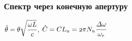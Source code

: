 \documentclass[14pt, hyperref = {colorlinks}]{beamer}
\begin{document}
\small
\begin{frame}
\frametitle{Спектр через конечную апертуру}\label{t1}
\begin{figure}[h]
	\begin{minipage}[h]{0.99\linewidth}
	\end{minipage}	
\end{figure}
\hspace{-0pt}\tiny{$\hat{\theta} = \theta\sqrt{\cfrac{\omega L}{c}}$}, \tiny{$\mathnormal{\hat{C} = CL_u = 2\pi N_u\cfrac{\Delta\omega}{\omega_r}}$}
\end{frame}
\end{document}
